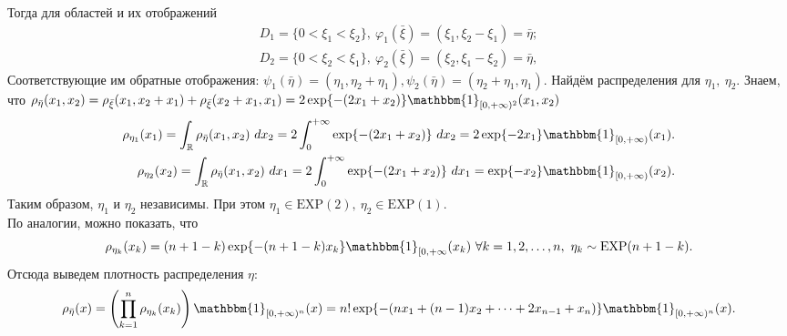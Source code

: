 \documentclass[specialist,
substylefile = spbu_report.rtx,
subf,href,colorlinks=true, 12pt]{disser}
\newcommand{\R}{\mathbb{R}}
\begin{document}
	Тогда для областей и их отображений
	\begin{align*}
		D_1 = \{0 < \xi_1 < \xi_2\},~\varphi_1(\bar{\xi}) = (\xi_1, \xi_2 - \xi_1) = \bar{\eta};
		\\D_2 = \{0 < \xi_2 < \xi_1\},~\varphi_2(\bar{\xi}) = (\xi_2, \xi_1 - \xi_2) = \bar{\eta},
	\end{align*}
	Соответствующие им обратные отображения: $\psi_1(\bar{\eta}) = (\eta_1, \eta_2 + \eta_1), \psi_2(\bar{\eta}) = (\eta_2 + \eta_1, \eta_1)$. Найдём распределения для $\eta_1,~\eta_2$. Знаем, что $\rho_{\bar{\eta}}(x_1, x_2) = \rho_{\bar{\xi}}(x_1, x_2 + x_1) + \rho_{\bar{\xi}}(x_2+x_1, x_1) = 2\exp\{-(2x_1 + x_2)\}\mathbbm{1}_{[0,+\infty)^2}(x_1,x_2)$
	\begin{align*}
		\rho_{\eta_1}(x_1) = \int_\R \rho_{\bar{\eta}}(x_1, x_2)~dx_2 = 2\int_0^{+\infty}\exp\{-(2x_1 + x_2)\}~dx_2 = 2\exp\{-2x_1\}\mathbbm{1}_{[0,+\infty)}(x_1).\\
		\rho_{\eta_2}(x_2) = \int_\R \rho_{\bar{\eta}}(x_1, x_2)~dx_1 = 2\int_0^{+\infty}\exp\{-(2x_1 + x_2)\}~dx_1 = \exp\{-x_2\}\mathbbm{1}_{[0,+\infty)}(x_2).
	\end{align*} 
	Таким образом, $\eta_1$ и $\eta_2$ независимы. При этом $\eta_1\in\mathrm{EXP}(2),~\eta_2\in \mathrm{EXP}(1)$.
	\\По аналогии, можно показать, что 
	\begin{equation*}
		\rho_{\eta_k}(x_k) = (n+1-k)\exp\{-(n+1-k)x_k\}\mathbbm{1}_{[0,+\infty}(x_k)~\forall k = 1, 2,\dots,n,~\eta_k\sim\mathrm{EXP}(n+1-k).
	\end{equation*}
	Отсюда выведем плотность распределения $\eta$:
	\begin{equation*}
		\rho_{\bar{\eta}}(x) = \left(\prod_{k=1}^n\rho_{\eta_k}(x_k)\right)\mathbbm{1}_{[0,+\infty)^n}(x)=n!\exp\{-(nx_1+(n-1)x_2+\dots+2x_{n-1}+x_n)\}\mathbbm{1}_{[0,+\infty)^n}(x).
	\end{equation*}
\end{document}
